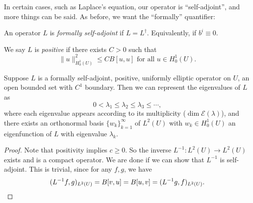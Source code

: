 \documentclass[a4paper]{article}
\begin{document}
%
In certain cases, such as Laplace's equation, our operator is ``self-adjoint'', and more things can be said. As before, we want the ``formally'' quantifier:
\begin{defi}
  An operator $L$ is \emph{formally self-adjoint} if $L = L^\dagger$. Equivalently, if $b^i \equiv 0$.
\end{defi}

\begin{defi}
  We say $L$ is \emph{positive} if there exists $C > 0$ such that
  \[
    \|u\|^2_{H_0^1(U)} \leq C B[u, u]\text{ for all }u \in H_0^1(U).
  \]
\end{defi}

\begin{thm}
  Suppose $L$ is a formally self-adjoint, positive, uniformly elliptic operator on $U$, an open bounded set with $C^1$ boundary. Then we can represent the eigenvalues of $L$ as
  \[
    0 < \lambda_1 \leq \lambda_2 \leq \lambda_3 \leq \cdots,
  \]
  where each eigenvalue appears according to its multiplicity ($\dim \mathcal{E}(\lambda)$), and there exists an orthonormal basis $\{w_k\}_{k = 1}^\infty$ of $L^2(U)$ with $w_k \in H_0^1(U)$ an eigenfunction of $L$ with eigenvalue $\lambda_k$.
\end{thm}

\begin{proof}
  Note that positivity implies $c \geq 0$. So the inverse $L^{-1}: L^2(U) \to L^2(U)$ exists and is a compact operator. We are done if we can show that $L^{-1}$ is self-adjoint. This is trivial, since for any $f, g$, we have
  \[
    (L^{-1} f, g)_{L^2(U)} = B[v, u] = B[u, v] = (L^{-1}g, f)_{L^2(U)}.\qedhere
  \]
%
\end{proof}
\end{document}
